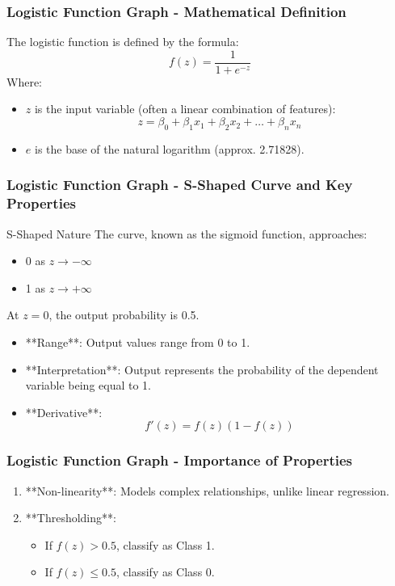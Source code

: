 \documentclass[aspectratio=169]{beamer}
\begin{document}
\begin{frame}[fragile]
    \frametitle{Logistic Function Graph - Mathematical Definition}
    The logistic function is defined by the formula:
    \begin{equation}
        f(z) = \frac{1}{1 + e^{-z}}
    \end{equation}
    Where:
    \begin{itemize}
        \item \( z \) is the input variable (often a linear combination of features):
        \begin{equation}
            z = \beta_0 + \beta_1 x_1 + \beta_2 x_2 + \ldots + \beta_n x_n
        \end{equation}
        \item \( e \) is the base of the natural logarithm (approx. 2.71828).
    \end{itemize}
\end{frame}

\begin{frame}[fragile]
    \frametitle{Logistic Function Graph - S-Shaped Curve and Key Properties}
    \begin{block}{S-Shaped Nature}
        The curve, known as the sigmoid function, approaches:
        \begin{itemize}
            \item 0 as \( z \to -\infty \)
            \item 1 as \( z \to +\infty \)
        \end{itemize}
        At \( z = 0 \), the output probability is 0.5.
    \end{block}
    
    \begin{itemize}
        \item **Range**: Output values range from 0 to 1.
        \item **Interpretation**: Output represents the probability of the dependent variable being equal to 1.
        \item **Derivative**:
        \begin{equation}
            f'(z) = f(z)(1 - f(z))
        \end{equation}
    \end{itemize}
\end{frame}

\begin{frame}[fragile]
    \frametitle{Logistic Function Graph - Importance of Properties}
    \begin{enumerate}
        \item **Non-linearity**: Models complex relationships, unlike linear regression.
        \item **Thresholding**:
        \begin{itemize}
            \item If \( f(z) > 0.5 \), classify as Class 1.
            \item If \( f(z) \leq 0.5 \), classify as Class 0.
        \end{itemize}
    \end{enumerate}
\end{frame}
\end{document}
